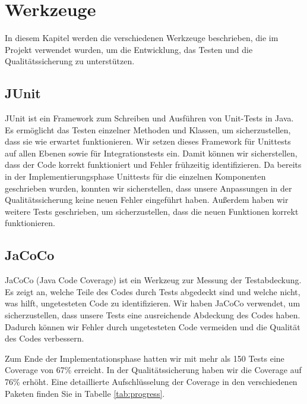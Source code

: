 
\chapter{Werkzeuge}
\label{ch:tools}

In diesem Kapitel werden die verschiedenen Werkzeuge beschrieben, die im Projekt verwendet wurden, um die Entwicklung, das Testen und die Qualitätssicherung zu unterstützen.

\section{JUnit}
JUnit ist ein Framework zum Schreiben und Ausführen von Unit-Tests in Java.
Es ermöglicht das Testen einzelner Methoden und Klassen, um sicherzustellen, dass sie wie erwartet funktionieren.
Wir setzen dieses Framework für Unittests auf allen Ebenen sowie für Integrationstests ein.
Damit können wir sicherstellen, dass der Code korrekt funktioniert und Fehler frühzeitig identifizieren.
Da bereits in der Implementierungsphase Unittests für die einzelnen Komponenten geschrieben wurden, konnten wir sicherstellen,
dass unsere Anpassungen in der Qualitätssicherung keine neuen Fehler eingeführt haben.
Außerdem haben wir weitere Tests geschrieben, um sicherzustellen, dass die neuen Funktionen korrekt funktionieren.

\section{JaCoCo}
JaCoCo (Java Code Coverage) ist ein Werkzeug zur Messung der Testabdeckung.
Es zeigt an, welche Teile des Codes durch Tests abgedeckt sind und welche nicht, was hilft, ungetesteten Code zu identifizieren.
Wir haben JaCoCo verwendet, um sicherzustellen, dass unsere Tests eine ausreichende Abdeckung des Codes haben.
Dadurch können wir Fehler durch ungetesteten Code vermeiden und die Qualität des Codes verbessern.

Zum Ende der Implementationsphase hatten wir mit mehr als 150 Tests eine Coverage von 67\% erreicht.
In der Qualitätssicherung haben wir die Coverage auf 76\% erhöht.
Eine detaillierte Aufschlüsselung der Coverage in den verschiedenen Paketen finden Sie in Tabelle \ref{tab:progress}.


